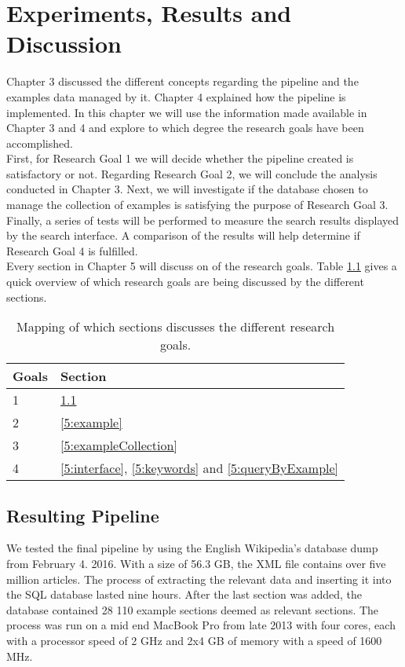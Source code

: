 
\chapter{Experiments, Results and Discussion} \label{cap_5}


Chapter 3 discussed the different concepts regarding the pipeline and the examples data managed by it. Chapter 4 explained how the pipeline is implemented. In this chapter we will use the information made available in Chapter 3 and 4 and explore to which degree the research goals have been accomplished.\\
First, for Research Goal 1 we will decide whether the pipeline created is satisfactory or not. Regarding Research Goal 2, we will conclude the analysis conducted in Chapter 3. Next, we will investigate if the database chosen to manage the collection of examples is satisfying the purpose of Research Goal 3. Finally, a series of tests will be performed to measure the search results displayed by the search interface. A comparison of the results will help determine if Research Goal 4 is fulfilled. \\
Every section in Chapter 5 will discuss on of the research goals. Table \ref{table:rgSecMapping} gives a quick overview of which research goals are being discussed by the different sections.

\begin{table}[h]
\centering
\begin{tabular} {|| p{5em} | p{10em} ||} 
 \hline
  Goals & Section \\ [0.5ex] 
 \hline
1   &   \ref{5:pipeline} \\
2   &   \ref{5:example} \\
3   &   \ref{5:exampleCollection} \\
4   &   \ref{5:interface}, \ref{5:keywords} and \ref{5:queryByExample} \\
 \hline
\end{tabular}
\caption{Mapping of which sections discusses the different research goals.}
\label{table:rgSecMapping}
\end{table}

\section{Resulting Pipeline} \label{5:pipeline}

We tested the final pipeline by using the English Wikipedia's database dump from February 4. 2016. With a size of 56.3 GB, the XML file contains over five million articles. The process of extracting the relevant data and inserting it into the SQL database lasted nine hours. After the last section was added, the database contained 28 110 example sections deemed as relevant sections. The process was run on a mid end MacBook Pro from late 2013 with four cores, each with a processor speed of 2 GHz and 2x4 GB of memory with a speed of 1600 MHz.

